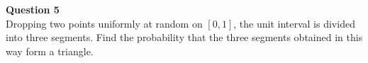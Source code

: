 \documentclass[addpoints]{exam}
\begin{document}
\begin{questions}
\begin{solution}
\end{solution}
\question \textbf{ Question 5}\\
Dropping two points uniformly at random on \([0, 1]\), the unit interval is divided into three segments.
Find the probability that the three segments obtained in this way form a triangle.
\begin{solution}\\
 
\end{solution}
\end{questions}
\end{document}
